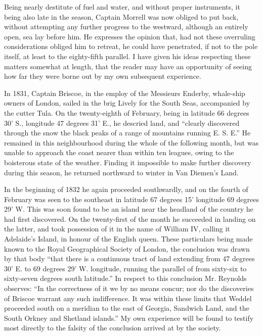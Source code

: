 Being nearly destitute of fuel and water, and without proper instruments, it
being also late in the season, Captain Morrell was now obliged to put back,
without attempting any further progress to the westward, although an entirely
open, sea lay before him. He expresses the opinion that, had not these
overruling considerations obliged him to retreat, he could have penetrated, if
not to the pole itself, at least to the eighty-fifth parallel. I have given his
ideas respecting these matters somewhat at length, that the reader may have an
opportunity of seeing how far they were borne out by my own subsequent
experience. 

In 1831, Captain Briscoe, in the employ of the Messieurs Enderby, whale-ship
owners of London, sailed in the brig Lively for the South Seas, accompanied by
the cutter Tula. On the twenty-eighth of February, being in latitude 66 degrees
30' S., longitude 47 degrees 31' E., he descried land, and ``clearly discovered
through the snow the black peaks of a range of mountains running E. S. E.'' He
remained in this neighbourhood during the whole of the following month, but was
unable to approach the coast nearer than within ten leagues, owing to the
boisterous state of the weather. Finding it impossible to make further discovery
during this season, he returned northward to winter in Van Diemen's Land. 

In the beginning of 1832 he again proceeded southwardly, and on the fourth of
February was seen to the southeast in latitude 67 degrees 15' longitude 69
degrees 29' W. This was soon found to be an island near the headland of the
country he had first discovered. On the twenty-first of the month he succeeded
in landing on the latter, and took possession of it in the name of William IV,
calling it Adelaide's Island, in honour of the English queen. These particulars
being made known to the Royal Geographical Society of London, the conclusion was
drawn by that body ``that there is a continuous tract of land extending from 47
degrees 30' E. to 69 degrees 29' W. longitude, running the parallel of from
sixty-six to sixty-seven degrees south latitude.'' In respect to this conclusion
Mr. Reynolds observes: ``In the correctness of it we by no means concur; nor do
the discoveries of Briscoe warrant any such indifference. It was within these
limits that Weddel proceeded south on a meridian to the east of Georgia,
Sandwich Land, and the South Orkney and Shetland islands.'' My own experience
will be found to testify most directly to the falsity of the conclusion arrived
at by the society. 

